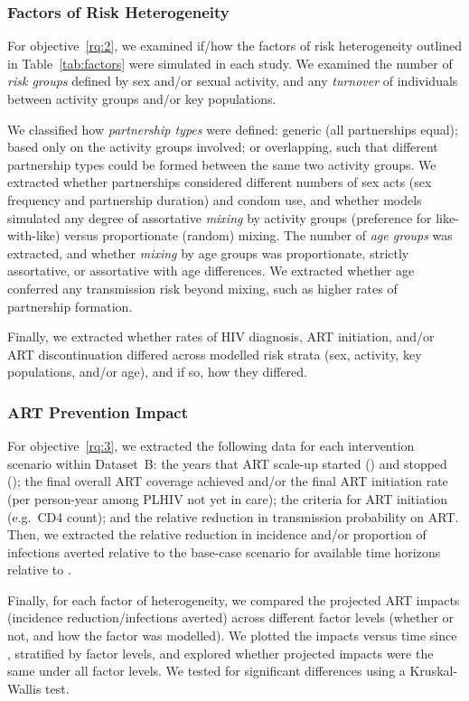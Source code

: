 \subsubsection{Factors of Risk Heterogeneity}
\label{sss:meth:factors}
For objective~\ref{rq:2}, we examined if/how
the factors of risk heterogeneity outlined in Table~\ref{tab:factors}
were simulated in each study.
We examined the number of \emph{risk groups} defined by sex and/or sexual activity, and
any \emph{turnover} of individuals between activity groups and/or key populations.
\par
We classified how \emph{partnership types} were defined:
generic (all partnerships equal);
based only on the activity groups involved;
or overlapping, such that different partnership types could be formed between the same two activity groups.
We extracted whether partnerships considered different
numbers of sex acts (sex frequency and partnership duration) and condom use,
and whether models simulated any degree of assortative \emph{mixing} by activity groups
(preference for like-with-like) versus proportionate (random) mixing.
The number of \emph{age groups} was extracted, and whether \emph{mixing} by age groups was
proportionate, strictly assortative, or assortative with age differences.
We extracted whether age conferred any transmission risk beyond mixing,
such as higher rates of partnership formation.
\par
Finally, we extracted whether rates of HIV diagnosis, ART initiation, and/or ART discontinuation
differed across modelled risk strata (sex, activity, key populations, and/or age),
and if so, how they differed.
\subsubsection{ART Prevention Impact}
\label{sss:meth:api}
For objective~\ref{rq:3}, we extracted
the following data for each intervention scenario within Dataset~B:
the years that ART scale-up started () and stopped ();
the final overall ART coverage achieved and/or
the final ART initiation rate (per person-year among PLHIV not yet in care);
the criteria for ART initiation (e.g.\ CD4 count); and
the relative reduction in transmission probability on ART.
Then, we extracted the
relative reduction in incidence and/or proportion of infections averted
relative to the base-case scenario for available time horizons relative to .
\par
Finally, for each factor of heterogeneity,
we compared the projected ART impacts (incidence reduction/infections averted)
across different factor levels (whether or not, and how the factor was modelled).
We plotted the impacts versus time since , stratified by factor levels,
and explored whether projected impacts were the same under all factor levels.
We tested for significant differences using a Kruskal-Wallis test.